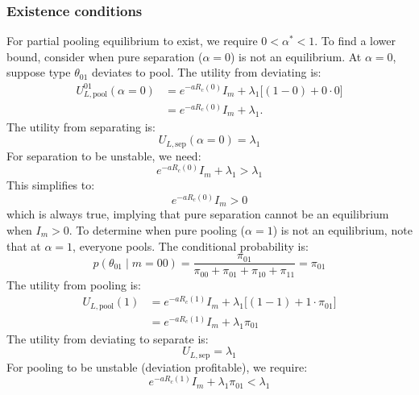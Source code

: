 \documentclass[sigconf,review]{acmart}
\begin{document}
\subsubsection{Existence conditions}
For partial pooling equilibrium to exist, we require $0 < \alpha^* < 1$. To find a lower bound, consider when pure separation ($\alpha = 0$) is not an equilibrium. At $\alpha = 0$, suppose type $\theta_{01}$ deviates to pool. The utility from deviating is:
\begin{equation}
\begin{aligned}
U_{L,\text{pool}}^{01}(\alpha=0)
&= e^{-a R_c(0)} I_m + \lambda_1 \big[(1 - 0) + 0 \cdot 0 \big] \\
&= e^{-a R_c(0)} I_m + \lambda_1 .
\end{aligned}
\end{equation}
The utility from separating is:
\begin{equation}
U_{L,\text{sep}}(\alpha=0) = \lambda_1
\end{equation}
For separation to be unstable, we need:
\begin{equation}
e^{-a R_c(0)} I_m + \lambda_1 > \lambda_1
\end{equation}
This simplifies to:
\begin{equation}
e^{-a R_c(0)} I_m > 0
\end{equation}
which is always true, implying that pure separation cannot be an equilibrium when $I_m > 0$. To determine when pure pooling ($\alpha = 1$) is not an equilibrium, note that at $\alpha = 1$, everyone pools. The conditional probability is:
\begin{equation}
p(\theta_{01} \mid m = 00) = \frac{\pi_{01}}{\pi_{00} + \pi_{01} + \pi_{10} + \pi_{11}} = \pi_{01}
\end{equation}
The utility from pooling is:
\begin{equation}
\begin{aligned}
U_{L,\text{pool}}(1) &= e^{-a R_c(1)} I_m + \lambda_1 \big[(1 - 1) + 1 \cdot \pi_{01}\big]\\& = e^{-a R_c(1)} I_m + \lambda_1 \pi_{01}
\end{aligned}
\end{equation}
The utility from deviating to separate is:
\begin{equation}
U_{L,\text{sep}} = \lambda_1
\end{equation}
For pooling to be unstable (deviation profitable), we require:
\begin{equation}
e^{-a R_c(1)} I_m + \lambda_1 \pi_{01} < \lambda_1
\end{equation}
\end{document}
